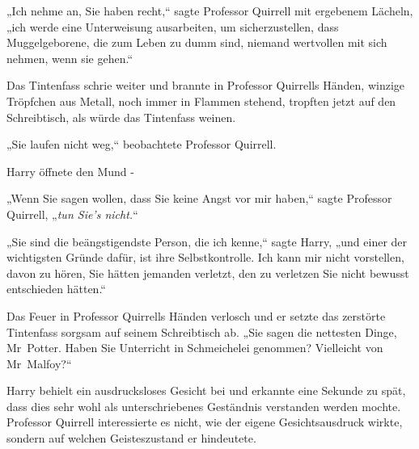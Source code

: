 „Ich nehme an, Sie haben recht,“ sagte Professor Quirrell mit ergebenem Lächeln, „ich werde eine Unterweisung ausarbeiten, um sicherzustellen, dass Muggelgeborene, die zum Leben zu dumm sind, niemand wertvollen mit sich nehmen, wenn sie gehen.“

Das Tintenfass schrie weiter und brannte in Professor Quirrells Händen, winzige Tröpfchen aus Metall, noch immer in Flammen stehend, tropften jetzt auf den Schreibtisch, als würde das Tintenfass weinen.

„Sie laufen nicht weg,“ beobachtete Professor Quirrell.

Harry öffnete den Mund -

„Wenn Sie sagen wollen, dass Sie keine Angst vor mir haben,“ sagte Professor Quirrell, „\emph{tun Sie's nicht.}“

„Sie sind die beängstigendste Person, die ich kenne,“ sagte Harry, „und einer der wichtigsten Gründe dafür, ist ihre Selbstkontrolle. Ich kann mir nicht vorstellen, davon zu hören, Sie hätten jemanden verletzt, den zu verletzen Sie nicht bewusst entschieden hätten.“

Das Feuer in Professor Quirrells Händen verlosch und er setzte das zerstörte Tintenfass sorgsam auf seinem Schreibtisch ab. „Sie sagen die nettesten Dinge, Mr~Potter. Haben Sie Unterricht in Schmeichelei genommen? Vielleicht von Mr~Malfoy?“

Harry behielt ein ausdrucksloses Gesicht bei und erkannte eine Sekunde zu spät, dass dies sehr wohl als unterschriebenes Geständnis verstanden werden mochte. Professor Quirrell interessierte es nicht, wie der eigene Gesichtsausdruck wirkte, sondern auf welchen Geisteszustand er hindeutete.

